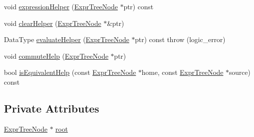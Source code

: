 \begin{DoxyCompactItemize}
\item 
void \hyperlink{class_expr_tree_a7575f010e1ca9dfd2abbe15d4fe387b9}{expression\+Helper} (\hyperlink{class_expr_tree_1_1_expr_tree_node}{Expr\+Tree\+Node} $\ast$ptr) const 
\item 
void \hyperlink{class_expr_tree_a3c31a2f832e1949790e79d3f23ffa0bb}{clear\+Helper} (\hyperlink{class_expr_tree_1_1_expr_tree_node}{Expr\+Tree\+Node} $\ast$\&ptr)
\item 
Data\+Type \hyperlink{class_expr_tree_a0e18bcfbe367fcc55eca5a7cc9179788}{evaluate\+Helper} (\hyperlink{class_expr_tree_1_1_expr_tree_node}{Expr\+Tree\+Node} $\ast$ptr) const   throw (logic\+\_\+error)
\item 
void \hyperlink{class_expr_tree_abbf18be89ca86f59350e8d6bab8c65dd}{commute\+Help} (\hyperlink{class_expr_tree_1_1_expr_tree_node}{Expr\+Tree\+Node} $\ast$ptr)
\item 
bool \hyperlink{class_expr_tree_aac6ff43c0f59106d2f137b620aeeda46}{is\+Equivalent\+Help} (const \hyperlink{class_expr_tree_1_1_expr_tree_node}{Expr\+Tree\+Node} $\ast$home, const \hyperlink{class_expr_tree_1_1_expr_tree_node}{Expr\+Tree\+Node} $\ast$source) const 
\end{DoxyCompactItemize}
\subsection*{Private Attributes}
\begin{DoxyCompactItemize}
\item 
\hyperlink{class_expr_tree_1_1_expr_tree_node}{Expr\+Tree\+Node} $\ast$ \hyperlink{class_expr_tree_ac8638e86184df382f2dfdaf49000e34b}{root}
\end{DoxyCompactItemize}


